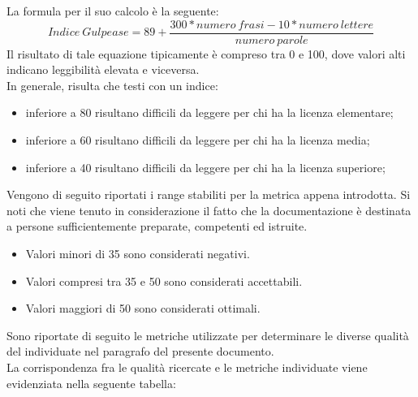 					La formula per il suo calcolo è la seguente:
					\begin{equation}
						\label{eq:gulpease}
						Indice\ Gulpease = 89 + \frac{300*numero\ frasi-10*numero\ lettere}{numero\ parole}
					\end{equation}
					Il risultato di tale equazione tipicamente è compreso tra 0 e 100, dove valori alti indicano leggibilità elevata e viceversa.\\
					In generale, risulta che testi con un indice:
					\begin{itemize}
						\item inferiore a 80 risultano difficili da leggere per chi ha la licenza elementare;
						\item inferiore a 60 risultano difficili da leggere per chi ha la licenza media;
						\item inferiore a 40 risultano difficili da leggere per chi ha la licenza superiore;
					\end{itemize}
					Vengono di seguito riportati i range stabiliti per la metrica appena introdotta. Si noti che viene tenuto in considerazione il fatto 
					che la documentazione è destinata a persone sufficientemente preparate, competenti ed istruite.
					\begin{itemize}
						\item Valori minori di 35 sono considerati negativi.
						\item Valori compresi tra 35 e 50 sono considerati accettabili.
						\item Valori maggiori di 50 sono considerati ottimali.
					\end{itemize}
			Sono riportate di seguito le metriche utilizzate per determinare le diverse qualità del  individuate nel paragrafo  del presente documento.
			\\La corrispondenza fra le qualità ricercate e le metriche individuate viene evidenziata nella seguente tabella:\\
